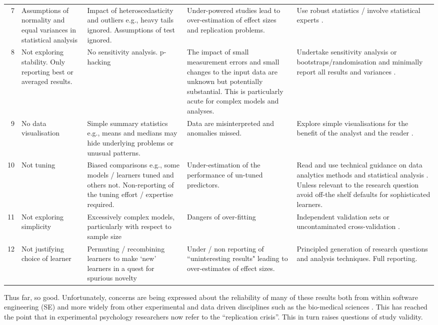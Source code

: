 \documentclass[preprint,10pt]{elsarticle}
\begin{document}
\begin{table}
\begin{center}
\begin{tabular}{|r|p{1.7cm}|p{2.3cm}|p{2.5cm}|p{3cm}|}
7  & Assumptions of normality and equal variances in statistical analysis & Impact of heteroscedasticity and outliers e.g., heavy tails ignored.  Assumptions of test ignored.  & Under-powered studies lead to over-estimation of effect sizes and replication problems. & Use robust statistics / involve statistical experts \cite{Kitc02,Wilc12}.\\
\rowcolor{gray!50}8 & Not exploring stability.  Only reporting best or averaged results. & No sensitivity analysis. p-hacking & The impact of small measurement errors and small changes to the input data are unknown but potentially substantial.  This is particularly acute for complex models and analyses. & Undertake sensitivity analysis or bootstraps/randomisation and minimally report all results and variances \cite{Manl97,Salt00}.\\
9 & No data visualisation & Simple summary statistics e.g., means and medians may hide underlying problems or unusual patterns. & Data are misinterpreted and anomalies missed. & Explore simple visualisations for the benefit of the analyst and the reader \cite{Mya09,Heal18}.\\
\rowcolor{gray!50}
10 & Not tuning & Biased comparisons e.g., some models / learners tuned and others not. Non-reporting of the tuning effort / expertise required. & Under-estimation of the performance of un-tuned predictors. & Read and use technical guidance on data analytics methods and statistical analysis \cite{Snoe12,fu2016}.  Unless relevant to the research question avoid off-the shelf defaults for sophisticated learners.\\
11 & Not exploring simplicity & Excessively complex models, particularly with respect to sample size  & Dangers of over-fitting & Independent validation sets or uncontaminated cross-validation \cite{Cawl10}. \\
\rowcolor{gray!50} 
12 & Not justifying choice of learner & Permuting / recombining learners to make `new' learners in a quest for spurious novelty & Under / non reporting of ``uninteresting results" leading to over-estimates of effect sizes. & Principled generation of research questions and analysis techniques. Full reporting. \\
\hline
\end{tabular}
\end{center}
\label{Tab:BadSmells}
\end{table}%

Thus far, so good.  Unfortunately, concerns are being expressed about the reliability of many of these results both from within software engineering (SE) \cite{Shep14,Jorg16} and more widely from other experimental and data driven disciplines such as the bio-medical sciences \cite{Ioan05,Earp15}.  This has reached the point that in experimental psychology researchers now refer to the ``replication crisis''.  This in turn raises questions of study validity.
\end{document}
